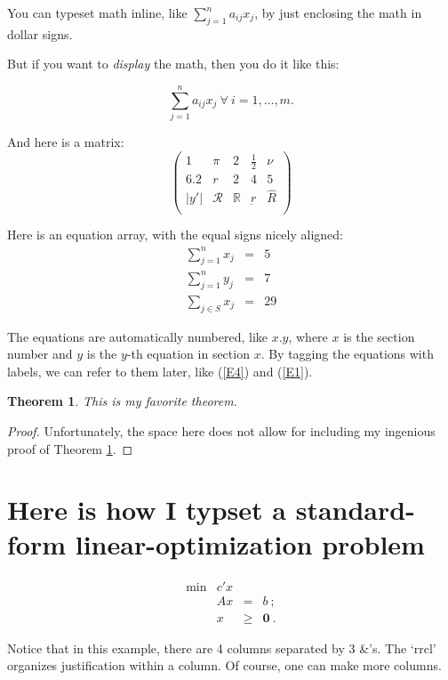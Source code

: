\documentclass{amsart}
\newtheorem{thm}{Theorem}[section]
\theoremstyle{definition}
\theoremstyle{remark}
\numberwithin{equation}{section}
\begin{document}
You can typeset math inline, like $\sum_{j=1}^n a_{ij} x_j$, by just enclosing the math in dollar signs.

But if you want to \emph{display} the math, then you do it like this:

\[
\sum_{j=1}^n a_{ij} x_j~ \forall~ i=1,\ldots,m.
\]

And here is a matrix:
\[
\left(
  \begin{array}{ccccc}
    1 & \pi & 2& \frac{1}{2} & \nu \\
    6.2 & r & 2 & 4 & 5 \\
    |y'| & \mathcal{R} & \mathbb{R} & \underbar{r} & \hat{R} \\
  \end{array}
\right)
\]

Here is an equation array, with the equal signs nicely aligned:
\begin{eqnarray}
  \sum_{j=1}^n x_j &=& 5 \label{E1} \\
    \sum_{j=1}^n y_j &=& 7 \label{E7} \\
  \sum_{j\in S} x_j &=& 29 \label{E4}
\end{eqnarray}

The equations are automatically numbered, like $x.y$, where
$x$ is the section number and $y$ is the $y$-th equation in section $x$.
By tagging the equations
with labels, we can refer to them later, like (\ref{E4}) and (\ref{E1}).

\begin{thm}\label{Favorite}
This is my favorite theorem.
\end{thm}
\begin{proof}
Unfortunately, the space here does not allow for including my ingenious proof
of Theorem \ref{Favorite}.
\end{proof}

\section{Here is how I typset a standard-form linear-optimization problem}

\[
\tag{P}
\begin{array}{rrcl}
 \min & c'x  &      &   \\
      &  Ax  &   =  & b~; \\
      &   x  & \geq & \mathbf{0}~.
\end{array}
\]

Notice that in this example, there are 4 columns separated by 3 \&'s.
The `rrcl' organizes justification within a column.
Of course, one can make more columns.
\end{document}
